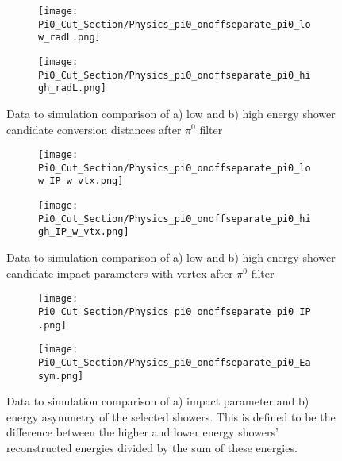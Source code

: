 \documentclass{article}
\begin{document}
\begin{figure}[t!]
\centering
  \begin{subfigure}[t]{0.3\textwidth}
    \centering
\texttt{[image: Pi0\_Cut\_Section/Physics\_pi0\_onoffseparate\_pi0\_low\_radL.png]}
  \caption{ }
  \end{subfigure} 
  \hspace{30mm}
  \begin{subfigure}[t]{0.3\textwidth}
    \centering
\texttt{[image: Pi0\_Cut\_Section/Physics\_pi0\_onoffseparate\_pi0\_high\_radL.png]}
  \caption{ }
  \end{subfigure} 

\label{fig:physics_pi0_pi0_oangle}
\caption{ Data to simulation comparison of a) low and b) high energy shower candidate conversion distances  after $\pi^0$ filter }
\end{figure}

\begin{figure}[h!]
\centering
  \begin{subfigure}[t]{0.3\textwidth}
    \centering
\texttt{[image: Pi0\_Cut\_Section/Physics\_pi0\_onoffseparate\_pi0\_low\_IP\_w\_vtx.png]}
  \caption{ }
  \end{subfigure} 
  \hspace{30mm}
  \begin{subfigure}[t]{0.3\textwidth}
    \centering
\texttt{[image: Pi0\_Cut\_Section/Physics\_pi0\_onoffseparate\_pi0\_high\_IP\_w\_vtx.png]}
  \caption{ }
  \end{subfigure} 
\label{fig:physics_pi0_pi0_IP_w_vtx}
\caption{ Data to simulation comparison of a) low and b) high energy shower candidate impact parameters with vertex after $\pi^0$ filter }
\end{figure}

\begin{figure}[h!]
\centering
  \begin{subfigure}[t]{0.3\textwidth}
    \centering
\texttt{[image: Pi0\_Cut\_Section/Physics\_pi0\_onoffseparate\_pi0\_IP.png]}
  \caption{ }
  \end{subfigure} 
  \hspace{30mm}
  \begin{subfigure}[t]{0.3\textwidth}
    \centering
\texttt{[image: Pi0\_Cut\_Section/Physics\_pi0\_onoffseparate\_pi0\_Easym.png]}
  \caption{ }
  \end{subfigure} 
\label{fig:physics_pi0_pi0_IP}
\caption{ Data to simulation comparison of a) impact parameter and b) energy asymmetry of the selected showers. This is defined to be the difference between the higher and lower energy showers' reconstructed energies divided by the sum of these energies. }
\end{figure}
\end{document}
